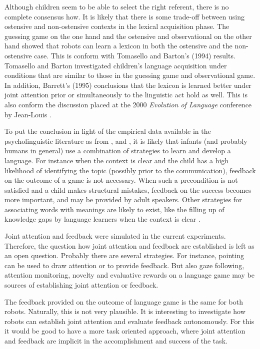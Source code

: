 Although children seem to be able to select the right referent, there is no complete consensus how. It is likely that there is some trade-off between using ostensive and non-ostensive contexts in the lexical acquisition phase. The guessing game on the one hand and the ostensive and observational on the other hand showed that robots can learn a lexicon in both the ostensive and the non-ostensive case. This is conform with Tomasello and Barton's (1994) results. Tomasello and Barton investigated children's language acquisition under conditions that are similar to those in the guessing game and observational game. In addition, Barrett's (1995) conclusions that the lexicon is learned better under joint attention prior or simultaneously to the linguistic act hold as well. This is also conform the discussion placed at the 2000 {\em Evolution of Language} conference by Jean-Louis \citet{dessalles:2000}.


To put the conclusion in light of the empirical data available in the psycholinguistic literature as from \citet{braine:1971}, \citet{demetrasetal:1986} and \citet{tomasellobarton:1994}, it is likely that infants (and probably humans in general) use a combination of strategies to learn and develop a language. For instance when the context is clear and the child has a high likelihood of identifying the topic (possibly prior to the communication), feedback on the outcome of a game is not necessary. When such a precondition is not satisfied and a child makes structural mistakes, feedback on the success becomes more important, and may be provided by adult speakers. Other strategies for associating words with meanings are likely to exist, like the filling up of knowledge gaps by language learners when the context is clear \citep{clark:1993}.
 

Joint attention and feedback were simulated in the current experiments. Therefore, the question how joint attention and feedback are established is left as an open question. Probably there are several strategies. For instance, pointing can be used to draw attention or to provide feedback. But also gaze following, attention monitoring, novelty and evaluative rewards on a language game may be sources of establishing joint attention or feedback. 

The feedback provided on the outcome of language game is the same for both robots. Naturally, this is not very plausible. It is interesting to investigate how robots can establish joint attention and evaluate feedback autonomously. For this it would be good to have a more task oriented approach, where joint attention and feedback are implicit in the accomplishment and success of the task.

